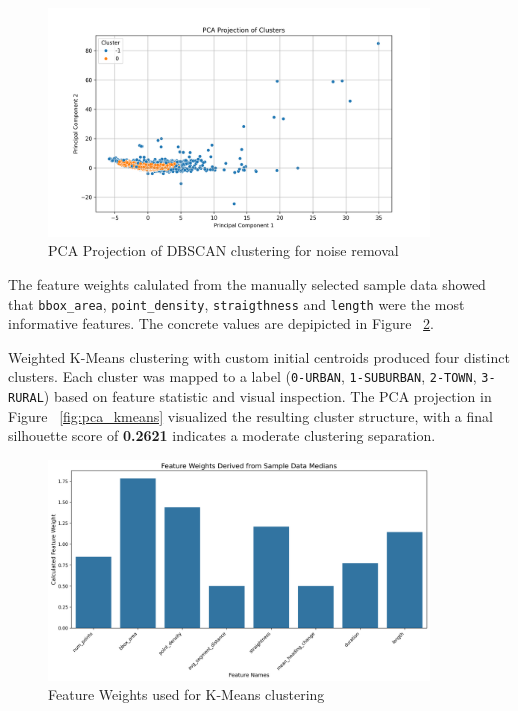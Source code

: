 \documentclass[a4paper,12pt,twoside]{scrreprt}
\begin{document}
\begin{figure}[htbp]
  \centering

  \includegraphics[width=0.9\textwidth]{Figures/dbscan_diagram_feature_data.png}
  \caption{PCA Projection of DBSCAN clustering for noise removal}
  \label{fig:pca_dbscan}
\end{figure}
\FloatBarrier

The feature weights calulated from the manually selected sample data showed
that \texttt{bbox\_area}, \texttt{point\_density},
\texttt{straigthness} and \texttt{length} were the most informative features.
The concrete values are depipicted
in Figure ~\ref{fig:feature_weights_for_kmeans}.

Weighted K-Means clustering with custom initial centroids produced four
distinct clusters. Each cluster was mapped to a label (\texttt{0-URBAN},
\texttt{1-SUBURBAN}, \texttt{2-TOWN}, \texttt{3-RURAL}) based on feature
statistic and visual inspection.
The PCA projection in Figure ~\ref{fig:pca_kmeans} visualized the resulting
cluster structure, with a final silhouette score of \textbf{0.2621} indicates a
moderate clustering
separation.

\begin{figure}[htbp]
  \centering

  \includegraphics[width=0.9\textwidth]{Figures/feature_weights.png}
  \caption{Feature Weights used for K-Means clustering}
  \label{fig:feature_weights_for_kmeans}
\end{figure}
\end{document}
